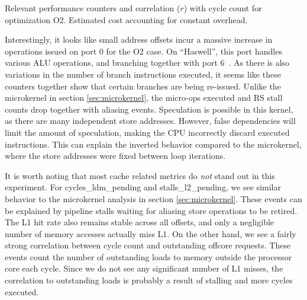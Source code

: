 \documentclass{acm_proc_article-sp}
\newcommand{\perfctr}[1] {
  {\lowercase{#1}}
}
\begin{document}
\begin{table*}[t]
  \renewcommand{\tabcolsep}{3pt} %
  \caption{Relevant performance counters and correlation ($r$) with cycle count for optimization O2. Estimated cost accounting for constant overhead.\label{tab:convstats}}{
    \pgfplotstabletypeset[
      int detect, %
      col sep=comma,
      columns={Performance counter, Correlation, 0, 2, 4, 8},
      column type=r,
      columns/Performance counter/.style={
        string type, 
        column type=l,
        column type/.add={|}{},
        postproc cell content/.append code={
          \pgfkeysalso{@cell content=\perfctr{##1}}
        }
      },
      columns/Correlation/.style={
        fixed,
        fixed zerofill,
        precision=2
      },
      every head row/.style={
        output empty row,
        before row={\hline
          Performance counter & $r$ & 0 & 2 & 4 & 8 \\
        },
        after row=\hline\hline
      },
      every last row/.style={after row=\hline},
      every last column/.style={column type/.add={}{|}}
    ]{bin/conv-default-o2-haswell.estimate.csv}
  }
\end{table*}

Interestingly, it looks like small address offsets incur a massive increase in operations issued on port 0 for the O2 case.
On ``Haswell'', this port handles various ALU operations, and branching together with port 6~\cite[Figure 2.1]{OptimizationManual}.
As there is also variations in the number of branch instructions executed, it seems like these counters together show that certain branches are being re-issued.
Unlike the microkernel in section \ref{sec:microkernel}, the micro-ops executed and RS stall counts drop together with aliasing events.
Speculation is possible in this kernel, as there are many independent store addresses.
However, false dependencies will limit the amount of speculation, making the CPU incorrectly discard executed instructions.
This can explain the inverted behavior compared to the microkernel, where the store addresses were fixed between loop iterations.

It is worth noting that most cache related metrics do \emph{not} stand out in this experiment.
For cycles\_ldm\_pending and stalls\_l2\_pending, we see similar behavior to the microkernel analysis in section \ref{sec:microkernel}.
These events can be explained by pipeline stalls waiting for aliasing store operations to be retired.
The L1 hit rate also remains stable across all offsets, and only a negligible number of memory accesses actually miss L1.
On the other hand, we see a fairly strong correlation between cycle count and outstanding offcore requests. 
These events count the number of outstanding loads to memory outside the processor core each cycle.
Since we do not see any significant number of L1 misses, the correlation to outstanding loads is probably a result of stalling and more cycles executed.
\end{document}
